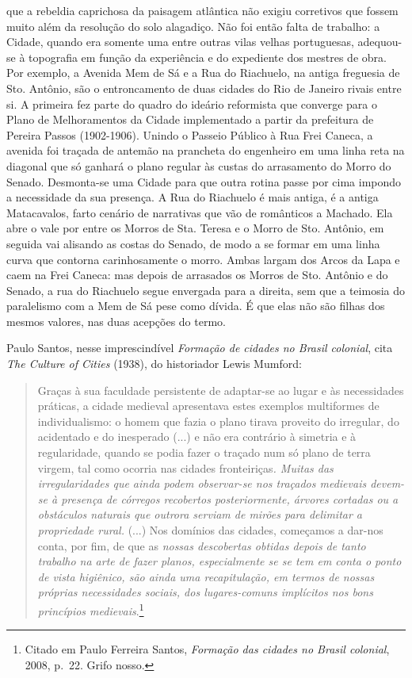 que a rebeldia caprichosa da paisagem atlântica não exigiu corretivos
que fossem muito além da resolução do solo alagadiço. Não foi então
falta de trabalho: a Cidade, quando era somente uma entre outras vilas
velhas portuguesas, adequou-se à topografia em função da experiência e
do expediente dos mestres de obra. Por exemplo, a Avenida Mem de Sá e a
Rua do Riachuelo, na antiga freguesia de Sto. Antônio, são o
entroncamento de duas cidades do Rio de Janeiro rivais entre si. A
primeira fez parte do quadro do ideário reformista que converge para o
Plano de Melhoramentos da Cidade implementado a partir da prefeitura de
Pereira Passos (1902-1906). Unindo o Passeio Público à Rua Frei Caneca,
a avenida foi traçada de antemão na prancheta do engenheiro em uma linha
reta na diagonal que só ganhará o plano regular às custas do arrasamento
do Morro do Senado. Desmonta-se uma Cidade para que outra rotina passe
por cima impondo a necessidade da sua presença. A Rua do Riachuelo é
mais antiga, é a antiga Matacavalos, farto cenário de narrativas que vão
de românticos a Machado. Ela abre o vale por entre os Morros de Sta.
Teresa e o Morro de Sto. Antônio, em seguida vai alisando as costas do
Senado, de modo a se formar em uma linha curva que contorna
carinhosamente o morro. Ambas largam dos Arcos da Lapa e caem na Frei
Caneca: mas depois de arrasados os Morros de Sto. Antônio e do Senado, a
rua do Riachuelo segue envergada para a direita, sem que a teimosia do
paralelismo com a Mem de Sá pese como dívida. É que elas não são filhas
dos mesmos valores, nas duas acepções do termo.

Paulo Santos, nesse imprescindível \emph{Formação de cidades no Brasil
colonial}, cita \emph{The Culture of Cities} (1938), do historiador
Lewis Mumford:

\begin{quote}
Graças à sua faculdade persistente de adaptar-se ao lugar e às
necessidades práticas, a cidade medieval apresentava estes exemplos
multiformes de individualismo: o homem que fazia o plano tirava proveito
do irregular, do acidentado e do inesperado (...) e não era contrário à
simetria e à regularidade, quando se podia fazer o traçado num só plano
de terra virgem, tal como ocorria nas cidades fronteiriças\emph{. Muitas
das irregularidades que ainda podem observar-se nos traçados medievais
devem-se à presença de córregos recobertos posteriormente, árvores
cortadas ou a obstáculos naturais que outrora serviam de mirões para
delimitar a propriedade rural.} (...) Nos domínios das cidades,
começamos a dar-nos conta, por fim, de que as \emph{nossas descobertas
obtidas depois de tanto trabalho na arte de fazer planos, especialmente
se se tem em conta o ponto de vista higiênico, são ainda uma
recapitulação, em termos de nossas próprias necessidades sociais, dos
lugares-comuns implícitos nos bons princípios medievais}.\footnote{Citado
  em Paulo Ferreira Santos, \emph{Formação das cidades no Brasil
  colonial}, 2008, p.~22. Grifo nosso.}
\end{quote}

